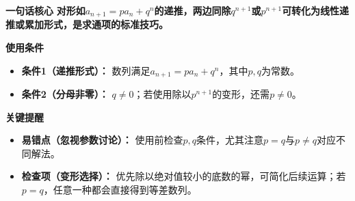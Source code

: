 \begin{summarybox}
	\textbf{\textcolor{CSummary}{一句话核心}}
	\textbf{对形如$a_{n+1}=p a_n+q^n$的递推，两边同除$q^{n+1}$或$p^{n+1}$可转化为线性递推或累加形式，是求通项的标准技巧。}

	\medskip
	\textbf{\textcolor{CSummary}{使用条件}}
	\begin{itemize}[leftmargin=*, itemsep=0.5em, topsep=0.4em]
		\item \textbf{条件1（递推形式）：} 数列满足$a_{n+1}=p a_n+q^n$，其中$p,q$为常数。
		\item \textbf{条件2（分母非零）：} $q\neq0$；若使用除以$p^{n+1}$的变形，还需$p\neq0$。
	\end{itemize}

	\medskip
	\textbf{\textcolor{CSummary}{关键提醒}}
	\begin{itemize}[leftmargin=*, itemsep=0.5em, topsep=0.4em]
		\item \textbf{易错点（忽视参数讨论）：} 使用前检查$p,q$条件，尤其注意$p=q$与$p\neq q$对应不同解法。
		\item \textbf{检查项（变形选择）：} 优先除以绝对值较小的底数的幂，可简化后续运算；若$p=q$，任意一种都会直接得到等差数列。
	\end{itemize}

\end{summarybox}
